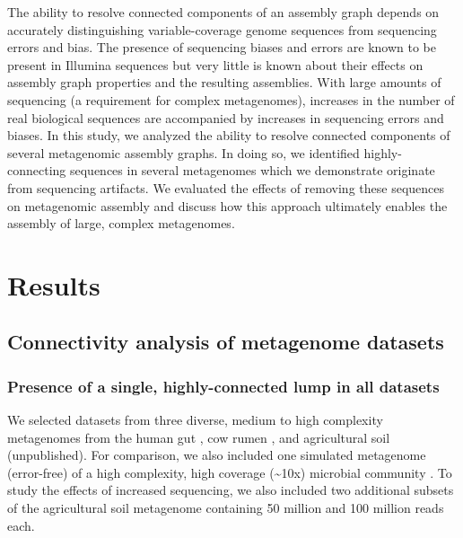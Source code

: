 \documentclass[11pt]{article} %
\begin{document}
The ability to resolve connected components of an assembly graph depends on accurately distinguishing variable-coverage genome sequences from sequencing errors and bias.  The presence of sequencing biases and errors are known to be present in Illumina sequences \cite{Harismendy:2009p228,Hoffmann:2009p1027,Nakamura:2011p741} but very little is known about their effects on assembly graph properties and the resulting assemblies.  With large amounts of sequencing (a requirement for complex metagenomes), increases in the number of real biological sequences are accompanied by increases in sequencing errors and biases.  In this study, we analyzed the ability to resolve connected components of several metagenomic assembly graphs.  In doing so, we identified highly-connecting sequences in several metagenomes which we demonstrate originate from sequencing artifacts.  We evaluated the effects of removing these sequences on metagenomic assembly and discuss how this approach ultimately enables the assembly of large, complex metagenomes.  

\section{Results}

\subsection{Connectivity analysis of metagenome datasets}

\subsubsection{Presence of a single, highly-connected lump in all datasets}
We selected datasets from three diverse, medium to high complexity metagenomes from the human gut \cite{Qin:2010p189}, cow rumen \cite{Hess:2011p686}, and agricultural soil (unpublished). For comparison, we also included one simulated metagenome (error-free) of a high complexity, high coverage (\textasciitilde{}10x) microbial community \cite{Pignatelli:2011p742}. To study the effects of increased sequencing, we also included two additional subsets of the agricultural soil metagenome containing 50 million and 100 million reads each.
\end{document}
